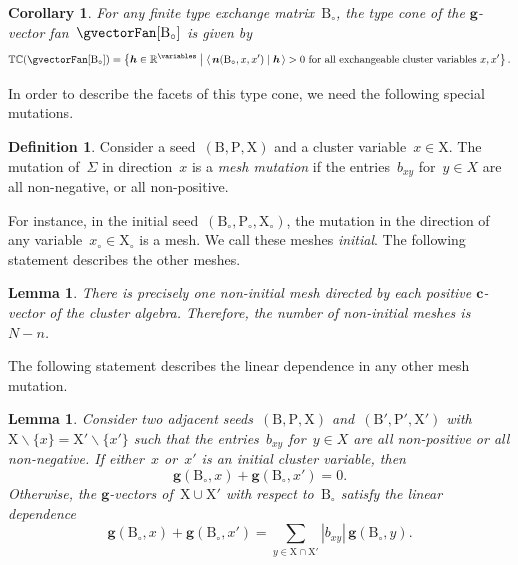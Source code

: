 \documentclass{amsart}
\newtheorem{corollary}[theorem]{Corollary}
\newtheorem{lemma}[theorem]{Lemma}
\theoremstyle{definition}
\newtheorem{definition}[theorem]{Definition}
\newcommand{\R}{\mathbb{R}} %
\renewcommand{\b}[1]{{\boldsymbol{#1}}} %
\newcommand{\set}[2]{\left\{ #1 \;\middle|\; #2 \right\}} %
\newcommand{\ssm}{\smallsetminus} %
\newcommand{\dotprod}[2]{\left\langle \, #1 \; \middle| \; #2 \, \right\rangle} %
\newcommand{\darkblue}{\color{darkblue}} %
\newcommand{\defn}[1]{\textsl{\darkblue #1}} %
\newcommand{\gvectorFull}[2]{\b{g}(#1,#2)} %
\newcommand{\typeCone}{\mathbb{TC}} %
\newcommand{\seed}{\Sigma} %
\newcommand{\cluster}{\mathrm{X}} %
\newcommand{\coefficients}{\mathrm{P}} %
\newcommand{\B}{\mathrm{B}} %
\begin{document}
\begin{corollary}
\label{coro:typeConeCA}
For any finite type exchange matrix~$\B_\circ$, the type cone of the $\b{g}$-vector fan~$\gvectorFan[\B_\circ]$ is given by
\[
\typeCone(\gvectorFan[\B_\circ]) = \set{\b{h} \in \R^{\variables}}{\dotprod{\b{n}(\B_\circ, x, x')}{\b{h}} > 0 \text{ for all exchangeable cluster variables } x, x'}.
\]
\end{corollary}

In order to describe the facets of this type cone, we need the following special mutations.

\begin{definition}
Consider a seed~$(\B, \coefficients, \cluster)$ and a cluster variable~$x \in \cluster$. The mutation of~$\seed$ in direction~$x$ is a \defn{mesh mutation} if the entries~$b_{xy}$ for~$y \in X$ are all non-negative, or all non-positive.
\end{definition}

For instance, in the initial seed~$(\B_\circ, \coefficients_\circ, \cluster_\circ)$, the mutation in the direction of any variable~${x_\circ \in \cluster_\circ}$ is a mesh.
We call these meshes \defn{initial}.
The following statement describes the other meshes.

\begin{lemma}
\label{lem:bijectionMeshMutations}
There is precisely one non-initial mesh directed by each positive $\b{c}$-vector of the cluster algebra. Therefore, the number of non-initial meshes is~$N-n$.
\end{lemma}

The following statement describes the linear dependence in any other mesh mutation.

\begin{lemma}
Consider two adjacent seeds~${(\B, \coefficients, \cluster)}$ and~${(\B', \coefficients', \cluster')}$ with~$\cluster \ssm \{x\} = \cluster' \ssm \{x'\}$ such that the entries~$b_{xy}$ for~$y \in X$ are all non-positive or all non-negative.
If either~$x$ or~$x'$ is an initial cluster variable, then
\[
\gvectorFull{\B_\circ}{x} + \gvectorFull{\B_\circ}{x'} = 0.
\]
Otherwise, the $\b{g}$-vectors of~$\cluster \cup \cluster'$ with respect to~$\B_\circ$ satisfy the linear dependence
\[
\gvectorFull{\B_\circ}{x} + \gvectorFull{\B_\circ}{x'} = \sum_{y \in \cluster \cap \cluster'} |b_{xy}| \, \gvectorFull{\B_\circ}{y}.
\]
\end{lemma}
\end{document}
